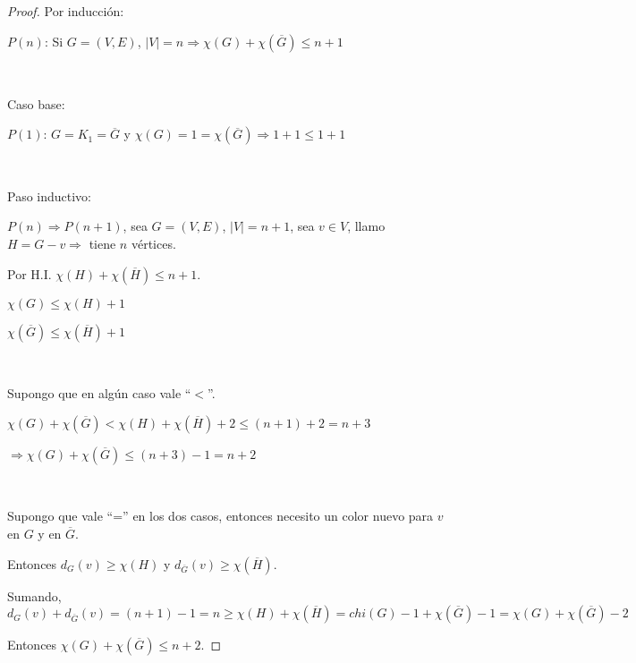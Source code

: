 \setcounter{subsection}{11}
\subsection{}
\subsubsection{}

\begin{proof}
	Por inducción:

	$P(n)$: Si $G = (V, E)$, $|V| = n \Longrightarrow \chi(G) + \chi(\overline{G}) \leq n + 1$

	~

	Caso base:

	$P(1)$: $G = K_1 = \overline{G}$ y $\chi(G) = 1 = \chi(\overline{G}) \Longrightarrow 1 + 1 \leq 1 + 1$

	~

	Paso inductivo:

	$P(n) \Longrightarrow P(n + 1)$, sea $G = (V, E)$, $|V| = n + 1$, sea $v \in V$, llamo $H = G - v \Longrightarrow$ tiene $n$ vértices.

	Por H.I. $\chi(H) + \chi(\overline{H}) \leq n + 1$.

	$\chi(G) \leq \chi(H) + 1$

	$\chi(\overline{G}) \leq \chi(\overline{H}) + 1$

	~

	Supongo que en algún caso vale ``$<$''.

	$\chi(G) + \chi(\overline{G}) < \chi(H) + \chi(\overline{H}) + 2 \leq (n + 1) + 2 = n + 3$

	$\Longrightarrow \chi(G) + \chi(\overline{G}) \leq (n + 3) - 1 = n + 2$

	~

	Supongo que vale ``='' en los dos casos, entonces necesito un color nuevo para $v$ en $G$ y en $\overline{G}$.

	Entonces $d_G(v) \geq \chi(H)$ y $d_{\overline{G}}(v) \geq \chi(\overline{H})$.

	Sumando, $d_G(v) + d_{\overline{G}}(v) = (n + 1) - 1 = n \geq \chi(H) + \chi(\overline{H}) = chi(G) - 1 + \chi(\overline{G}) - 1 = \chi(G) + \chi(\overline{G}) - 2$

	Entonces $\chi(G) + \chi(\overline{G}) \leq n + 2$.
\end{proof}

